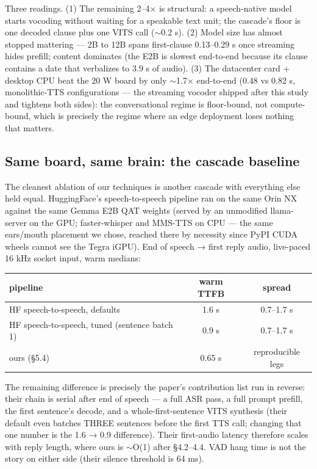 \documentclass[journal]{IEEEtran}
\begin{document}
Three readings. (1) The remaining 2–4× is structural: a speech-native model starts vocoding without waiting for a speakable text unit; the cascade's floor is one decoded clause plus one VITS call ($\sim$0.2 s). (2) Model size has almost stopped mattering — 2B to 12B spans first-clause 0.13–0.29 s once streaming hides prefill; content dominates (the E2B is slowest end-to-end because its clause contains a date that verbalizes to 3.9 s of audio). (3) The datacenter card + desktop CPU beat the 20 W board by only $\sim$1.7× end-to-end (0.48 vs 0.82 s, monolithic-TTS configurations — the streaming vocoder shipped after this study and tightens both sides): the conversational regime is floor-bound, not compute-bound, which is precisely the regime where an edge deployment loses nothing that matters.

\subsection{Same board, same brain: the cascade baseline}
The cleanest ablation of our techniques is another cascade with everything else held equal. HuggingFace's speech-to-speech pipeline ran on the same Orin NX against the same Gemma E2B QAT weights (served by an unmodified llama-server on the GPU; faster-whisper and MMS-TTS on CPU — the same ears/mouth placement we chose, reached there by necessity since PyPI CUDA wheels cannot see the Tegra iGPU). End of speech → first reply audio, live-paced 16 kHz socket input, warm medians:


\begin{table}[H]
\centering
\begin{tabular}{>{\raggedright\arraybackslash}p{2cm}cc}
\hline
pipeline & warm TTFB & spread \\
\hline
HF speech-to-speech, defaults & 1.6 s & 0.7--1.7 s \\
HF speech-to-speech, tuned (sentence batch 1) & 0.9 s & 0.7--1.7 s \\
ours (§5.4) & 0.65 s & reproducible legs \\
\hline
\end{tabular}
\end{table}

The remaining difference is precisely the paper's contribution list run in reverse: their chain is serial after end of speech — a full ASR pass, a full prompt prefill, the first sentence's decode, and a whole-first-sentence VITS synthesis (their default even batches THREE sentences before the first TTS call; changing that one number is the 1.6 → 0.9 difference). Their first-audio latency therefore scales with reply length, where ours is $\sim$O(1) after §4.2–4.4. VAD hang time is not the story on either side (their silence threshold is 64 ms).
\end{document}
